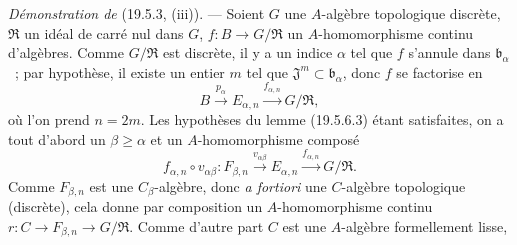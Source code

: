 \begin{env}[19.5.6.8]
\label{0.19.5.6.8-fr}
\emph{Démonstration de} (19.5.3, (iii)). --- Soient $G$ une $A$-algèbre
topologique discrète, $\mathfrak R$ un idéal de carré nul dans $G$,
$f:B\to G/\mathfrak R$ un $A$-homomorphisme continu d'algèbres. Comme
$G/\mathfrak R$ est discrète, il y a un indice $\alpha$ tel que $f$ s'annule
dans $\mathfrak b_\alpha$~; par hypothèse, il existe un entier $m$ tel que
$\mathfrak J^m\subset\mathfrak b_\alpha$, donc $f$ se factorise en
\[
  B\xrightarrow{p_\alpha}E_{\alpha,n}
  \xrightarrow{f_{\alpha,n}}G/\mathfrak R,
\]
où l'on prend $n=2m$. Les hypothèses du lemme (19.5.6.3) étant satisfaites, on
a tout d'abord un $\beta\geq\alpha$ et un $A$-homomorphisme composé
\begin{equation}
\label{0.19.5.6.9-fr}
  f_{\alpha,n}\circ v_{\alpha\beta}:F_{\beta,n}
  \xrightarrow{v_{\alpha\beta}}E_{\alpha,n}
  \xrightarrow{f_{\alpha,n}}G/\mathfrak R.
  \tag{19.5.6.9}
\end{equation}
Comme $F_{\beta,n}$ est une $C_\beta$-algèbre, donc \emph{a fortiori} une
$C$-algèbre topologique (discrète), cela donne par composition un
$A$-homomorphisme continu
$r:C\to F_{\beta,n}\to G/\mathfrak R$. Comme d'autre part $C$ est une
$A$-algèbre formellement lisse,



\end{env}

